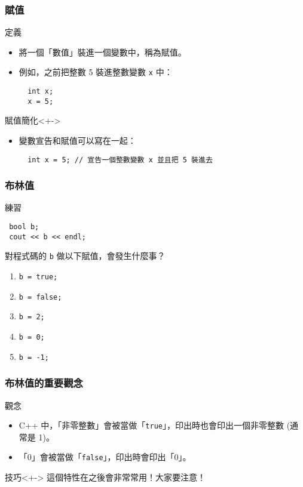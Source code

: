 \documentclass[utf8]{beamer}
\begin{document}
\begin{CJK}{UTF8}{bkai}
\begin{frame}[fragile]
  \frametitle{賦值}
  \begin{block}{定義}
    \begin{itemize}[<+->]
    \item 將一個「數值」裝進一個變數中，稱為\alert{賦值}。
    \item 例如，之前把整數 5 裝進整數變數 \lstinline{x}{} 中：
      \begin{lstlisting}
  int x;
  x = 5;
      \end{lstlisting}
    \end{itemize}
  \end{block}
  \begin{exampleblock}{賦值簡化}<+->
    \begin{itemize}
    \item 變數宣告和賦值可以寫在一起：
      \begin{lstlisting}
  int x = 5; // 宣告一個整數變數 x 並且把 5 裝進去
      \end{lstlisting}
    \end{itemize}
  \end{exampleblock}
\end{frame}

\begin{frame}[fragile]
  \frametitle{布林值}
  \begin{block}{練習}
    \begin{lstlisting}
 bool b;
 cout << b << endl;
    \end{lstlisting}
    對程式碼的 \lstinline{b}{} 做以下賦值，會發生什麼事？
    \begin{enumerate}
    \item<2-> \lstinline{b = true;}{}
    \item<3-> \lstinline{b = false;}{}
    \item<4-> \lstinline{b = 2;}{}
    \item<5-> \lstinline{b = 0;}{}
    \item<6-> \lstinline{b = -1;}{}
    \end{enumerate}
  \end{block}
\end{frame}

\begin{frame}[fragile]
  \frametitle{布林值的重要觀念}
  \begin{alertblock}{觀念}
    \begin{itemize}[<+->]
    \item C++ 中，「\alert{非零整數}」會被當做「\lstinline{true}{}」，印出時也會印出一個非零整數 (\alert{通常是 1})。
    \item 「0」會被當做「\lstinline{false}{}」，印出時會印出「\alert{0}」。
    \end{itemize}
  \end{alertblock}
  \begin{exampleblock}{技巧}<+->
  這個特性在之後會\alert{非常}常用！大家要注意！
  \end{exampleblock}
\end{frame}


\end{CJK}
\end{document}
